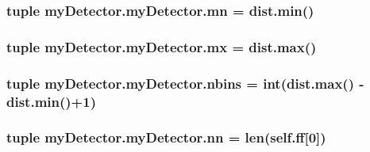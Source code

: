 \hypertarget{classmy_detector_1_1my_detector_a9b4d1ba192592e66b106294a29e570fa}{
\subsubsection[{mn}]{\setlength{\rightskip}{0pt plus 5cm}tuple my\-Detector.\-my\-Detector.\-mn = dist.\-min()\hspace{0.3cm}{\ttfamily [static]}}}\label{classmy_detector_1_1my_detector_a9b4d1ba192592e66b106294a29e570fa}
\hypertarget{classmy_detector_1_1my_detector_a7527caeb614bc6fe04eeb93654826835}{
\subsubsection[{mx}]{\setlength{\rightskip}{0pt plus 5cm}tuple my\-Detector.\-my\-Detector.\-mx = dist.\-max()\hspace{0.3cm}{\ttfamily [static]}}}\label{classmy_detector_1_1my_detector_a7527caeb614bc6fe04eeb93654826835}
\hypertarget{classmy_detector_1_1my_detector_ab1ca2803f8b16b976504a260af1ec86b}{
\subsubsection[{nbins}]{\setlength{\rightskip}{0pt plus 5cm}tuple my\-Detector.\-my\-Detector.\-nbins = int(dist.\-max() -\/ dist.\-min()+1)\hspace{0.3cm}{\ttfamily [static]}}}\label{classmy_detector_1_1my_detector_ab1ca2803f8b16b976504a260af1ec86b}
\hypertarget{classmy_detector_1_1my_detector_a386c22e4c8877c163e1c1855ac602d08}{
\subsubsection[{nn}]{\setlength{\rightskip}{0pt plus 5cm}tuple my\-Detector.\-my\-Detector.\-nn = len(self.\-ff\mbox{[}0\mbox{]})\hspace{0.3cm}{\ttfamily [static]}}}\label{classmy_detector_1_1my_detector_a386c22e4c8877c163e1c1855ac602d08}
